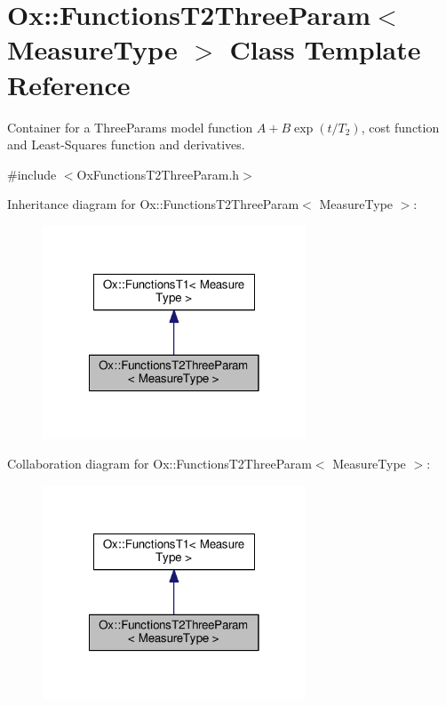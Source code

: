 \hypertarget{class_ox_1_1_functions_t2_three_param}{\section{Ox\-:\-:Functions\-T2\-Three\-Param$<$ Measure\-Type $>$ Class Template Reference}
\label{class_ox_1_1_functions_t2_three_param}
}


Container for a Three\-Params model function $ A + B\exp(t/T_2) $, cost function and Least-\/\-Squares function and derivatives.  




{\ttfamily \#include $<$Ox\-Functions\-T2\-Three\-Param.\-h$>$}



Inheritance diagram for Ox\-:\-:Functions\-T2\-Three\-Param$<$ Measure\-Type $>$\-:
\nopagebreak
\begin{figure}[H]
\begin{center}
\leavevmode
\includegraphics[width=222pt]{class_ox_1_1_functions_t2_three_param__inherit__graph}
\end{center}
\end{figure}


Collaboration diagram for Ox\-:\-:Functions\-T2\-Three\-Param$<$ Measure\-Type $>$\-:
\nopagebreak
\begin{figure}[H]
\begin{center}
\leavevmode
\includegraphics[width=222pt]{class_ox_1_1_functions_t2_three_param__coll__graph}
\end{center}
\end{figure}
